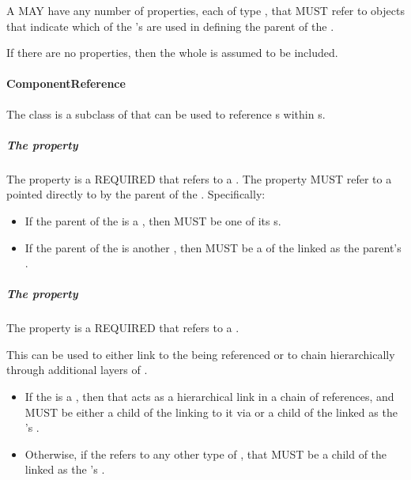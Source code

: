 A  MAY have any number of  properties, each of type , that MUST refer to   objects that indicate which  of the  's  are used in defining the parent of the .

If there are no  properties, then the whole  is assumed to be included. 


\paragraph{ComponentReference}
\label{sec:ComponentReference}

The  class is a subclass of  that can be used to reference s within s. 

\subparagraph{The  property}\label{sec:inChildOf}

The  property is a REQUIRED  that refers to a . 
The  property MUST refer to a  pointed directly to by the parent of the .
Specifically:
\begin{itemize}
\item If the parent of the  is a , then  MUST be one of its s.
\item If the parent of the  is another , then  MUST be a  of the  linked as  the parent's  .
\end{itemize}

\subparagraph{The  property}\label{sec:hasFeature:CR}

The  property is a REQUIRED  that refers to a .

This can be used to either link to the  being referenced or to chain hierarchically through additional layers of .
\begin{itemize}
\item If the  is a , then that  acts as a hierarchical link in a chain of references, and MUST be either a child of the  linking to it via  or a child of the  linked as  the 's  .
\item Otherwise, if the  refers to any other type of , that  MUST be a child of the  linked as  the 's  .
\end{itemize}

